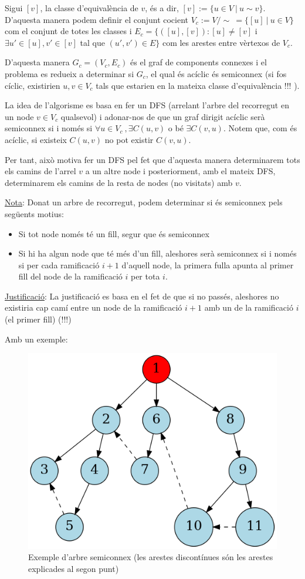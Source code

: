 \documentclass[a4paper,12pt]{article}
\begin{document}
Sigui $[v]$, la classe d'equivalència de $v$, és a dir, $[v] := \{u\in V \ | \ u \sim v \}$. D'aquesta manera podem definir el conjunt cocient $V_c := V/\sim \ = \{[u] \ | \ u \in V \}$ com el conjunt de totes les classes i $E_c = \{([u],[v]) : [u] \neq[v] $ i $ \exists u'\in[u],v'\in[v]$ tal que $(u',v') \in E \}$ com les arestes entre vèrtexos de $V_c$.

D'aquesta manera $G_c = (V_c, E_c)$ és el graf de components connexes i el problema es redueix a determinar si $G_c$, el qual és acíclic és semiconnex (si fos cíclic, existirien $u,v \in V_c$ tals que estarien en la mateixa classe d'equivalència !!! ).

La idea de l'algorisme es basa en fer un DFS (arrelant l'arbre del recorregut en un node $v \in V_c$ qualsevol) i adonar-nos de que un graf dirigit acíclic serà semiconnex si i només si $\forall u\in V_c \ , \exists C(u,v)$ o bé $ \exists C(v,u)$. Notem que, com és acíclic, si existeix $C(u,v)$ no pot existir $C(v,u)$.

Per tant, això motiva fer un DFS pel fet que d'aquesta manera determinarem tots els camins de l'arrel $v$ a un altre node i posteriorment, amb el mateix DFS, determinarem els camins de la resta de nodes (no visitats) amb $v$.

\underline{Nota}: Donat un arbre de recorregut, podem determinar si és semiconnex pels següents motius:
\begin{itemize}
    \item Si tot node només té un fill, segur que és semiconnex
    \item Si hi ha algun node que té més d'un fill, aleshores serà semiconnex si i només si per cada ramificació $i+1$ d'aquell node, la primera fulla apunta al primer fill del node de la ramificació $i$ per tota $i$. 
\end{itemize}

\underline{Justificació}: La justificació es basa en el fet de que si no passés, aleshores no existiria cap camí entre un node de la ramificació $i+1$ amb un de la ramificació $i$ (el primer fill) (!!!)

Amb un exemple:

\begin{figure}[H]
    \centering
    \includegraphics[width=0.5\linewidth]{semiconnex.png}
    \caption{Exemple d'arbre semiconnex (les arestes discontínues són les arestes explicades al segon punt)}
    \label{fig:G}
\end{figure}
\end{document}
